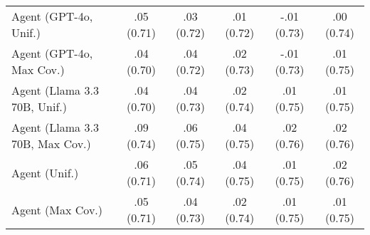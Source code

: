 \begin{table}[h!]
\begin{tabular}{lccccc}
    Agent (GPT-4o, Unif.) & .05 {\small (0.71)} & .03 {\small (0.72)} & .01 {\small (0.72)} & -.01 {\small (0.73)} & .00 {\small (0.74)} \\
    Agent (GPT-4o, Max Cov.) & .04 {\small (0.70)} & .04 {\small (0.72)} & .02 {\small (0.73)} & -.01 {\small (0.73)} & .01 {\small (0.75)} \\
    Agent (Llama 3.3 70B, Unif.) & .04 {\small (0.70)} & .04 {\small (0.73)} & .02 {\small (0.74)} & .01 {\small (0.75)} & .01 {\small (0.75)} \\
    Agent (Llama 3.3 70B, Max Cov.) & \cellcolor{silver!30}.09 {\small (0.74)} & \cellcolor{silver!30}.06 {\small (0.75)} & \cellcolor{bronze!30}.04 {\small (0.75)} & \cellcolor{gold!30}.02 {\small (0.76)} & \cellcolor{silver!30}.02 {\small (0.76)} \\
    Agent (Unif.) & .06 {\small (0.71)} & .05 {\small (0.74)} & \cellcolor{bronze!30}.04 {\small (0.75)} & .01 {\small (0.75)} & .02 {\small (0.76)} \\
    Agent (Max Cov.) & .05 {\small (0.71)} & .04 {\small (0.73)} & .02 {\small (0.74)} & .01 {\small (0.75)} & .01 {\small (0.75)} \\
    \bottomrule
    \end{tabular}
\end{table}